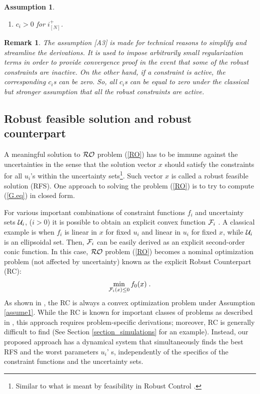 \documentclass[journal,twoside,web]{ieeecolor}
\newtheorem{assumption}[theorem]{Assumption}
\newtheorem{remark}{Remark}
\begin{document}
\begin{assumption} \label{assume_c>0}
\begin{enumerate}
\item [A3] $c_i > 0$ for $i^+_{[N]}$.
\end{enumerate}
\end{assumption}

\begin{remark} \label{active_inactive_constraint_rem}
The assumption [A3] is made for technical reasons to simplify and streamline the derivations. It is used to impose arbitrarily small regularization terms in order to provide convergence proof in the event that some of the robust constraints are inactive. On the other hand, if a constraint is active, the corresponding $c_i$s can be zero. So, all $c_i$s can be equal to zero under the classical but stronger assumption that all the robust constraints are active.
\end{remark}

\subsection{Robust feasible solution and robust counterpart}
A meaningful solution to ${\cal RO}$ problem (\ref{RO}) has to be immune against the uncertainties in the sense that the solution vector $x$ should satisfy the constraints for all $u_i$'s within the uncertainty sets\footnote{Similar to what is meant by feasibility in Robust Control \cite{zhou1995}.}. Such vector $x$ is called a robust feasible solution (RFS). One approach to solving the problem (\ref{RO}) is to try to compute (\ref{G.eq}) in closed form.

For various important combinations of constraint functions $f_i$ and uncertainty sets ${\cal U}_i$, ($i>0$) it is possible to obtain an explicit convex function ${\cal F}_i$ \cite{bental2009}. A classical example is when $f_i$ is linear in $x$ for fixed $u_i$ and linear in $u_i$ for fixed $x$, while ${\cal U}_i$ is an ellipsoidal set.
Then, ${\cal F}_i$ can be easily derived as an explicit second-order conic function.
In this case, ${\cal RO}$ problem (\ref{RO}) becomes a nominal optimization problem (not affected by uncertainty) known as the explicit Robust Counterpart (RC):
\begin{align} \label{rc}
\displaystyle \min_{{\cal F}_i(x)\leq 0} f_0(x)\;.
\end{align}
As shown in \cite{bental2009-2}, the RC is always a convex optimization problem under Assumption \ref{assume1}. While the RC is known for important classes of problems as described in \cite{bertsimas2011}, this approach requires problem-specific derivations; moreover, RC is generally difficult to find (See Section \ref{section_simulations} for an example). Instead, our proposed approach has a dynamical system that simultaneously finds the best RFS and the worst parameters $u_i$' s, independently of the specifics of the constraint functions and the uncertainty sets.
\end{document}
